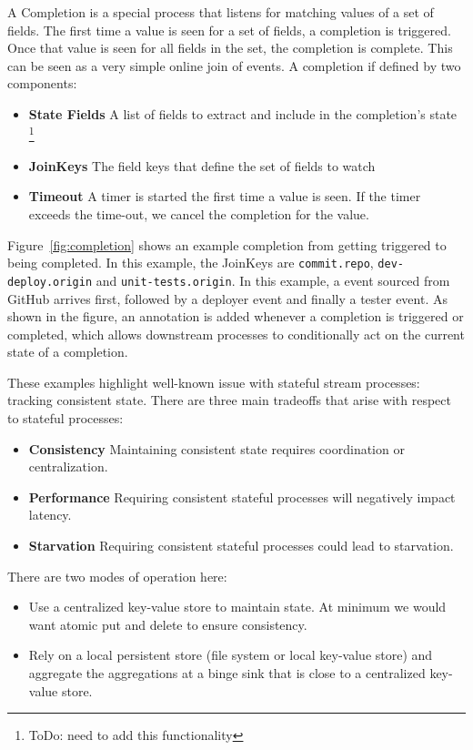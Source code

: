 \documentclass[10pt,twocolumn]{article}
\def\code#1{\texttt{#1}}
\begin{document}
A Completion is a special process that listens for matching values of a set of
fields.  The first time a value is seen for a set of fields, a completion is
triggered.  Once that value is seen for all fields in the set, the completion
is complete.  This can be seen as a very simple online join of events.  A completion
if defined by two components:

\begin{itemize}
\item[]{\bfseries State Fields} A list of fields to extract and include in the
completion's state \footnote{ToDo: need to add this functionality}
\item[]{{\bfseries JoinKeys}} The field keys that define the set of fields to watch
\item[]{{\bfseries Timeout}} A timer is started the first time a value is seen.
If the timer exceeds the time-out, we cancel the completion for the value.
\end{itemize}

Figure~\ref{fig:completion} shows an example completion from getting triggered
to being completed.  In this example, the JoinKeys are \code{commit.repo},
\code{dev-deploy.origin} and \code{unit-tests.origin}.  In this example, a event sourced
from GitHub arrives first, followed by a deployer event and finally a tester
event.  As shown in the figure, an annotation is added whenever a completion is
triggered or completed, which allows downstream processes to conditionally act
on the current state of a completion.

These examples highlight well-known issue with stateful stream processes:
tracking consistent state.  There are three main tradeoffs that arise with
respect to stateful processes:

\begin{itemize}
\item[]{{\bfseries Consistency}} Maintaining consistent state requires coordination or centralization.
\item[]{{\bfseries Performance}} Requiring consistent stateful processes will negatively impact latency.
\item[]{{\bfseries Starvation}} Requiring consistent stateful processes could lead to starvation.
\end{itemize}

There are two modes of operation here:

\begin{itemize}
\item{Use a centralized key-value store to maintain state.  At minimum we would
want atomic put and delete to ensure consistency.}
\item{Rely on a local persistent store (file system or local key-value store)
and aggregate the aggregations at a binge sink that is close to a centralized
key-value store.}
\end{itemize}
\end{document}
